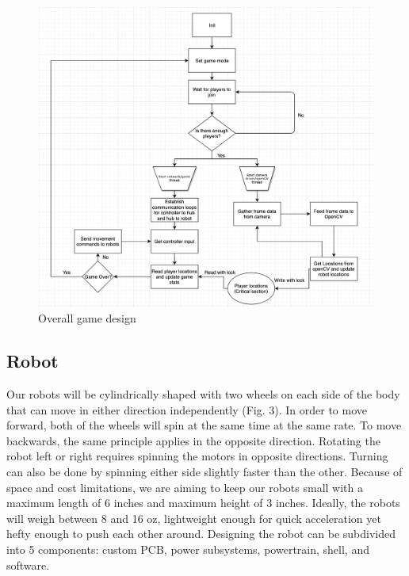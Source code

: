 \documentclass[11pt]{ieeeconf}
\begin{document}
 \begin{figure}[!t]
  \centering
  \captionsetup{justification=centering}
      \includegraphics[width=14cm]{images/Flowchart.png}
        \caption{Overall game design}
        \label{flowchart}
\end{figure}

\subsection{Robot}
Our robots will be cylindrically shaped with two wheels on each side of the body that can move in either direction independently (Fig. 3). In order to move forward, both of the wheels will spin at the same time at the same rate. To move backwards, the same principle applies in the opposite direction. Rotating the robot left or right requires spinning the motors in opposite directions. Turning can also be done by spinning either side slightly faster than the other. Because of space and cost limitations, we are aiming to keep our robots small with a maximum length of 6 inches and maximum height of 3 inches. Ideally, the robots will weigh between 8 and 16 oz, lightweight enough for quick acceleration yet hefty enough to push each other around. Designing the robot can be subdivided into 5 components: custom PCB, power subsystems, powertrain, shell, and software.
\end{document}
